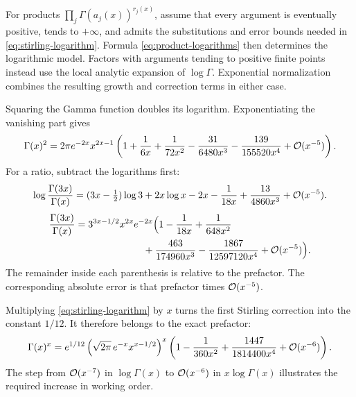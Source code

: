 For products $\prod_j\Gamma(a_j(x))^{r_j(x)}$, assume that every argument
is eventually positive, tends to $+\infty$, and admits the substitutions
and error bounds needed in \eqref{eq:stirling-logarithm}. Formula
\eqref{eq:product-logarithms} then determines the logarithmic model.
Factors with arguments tending to positive finite points instead use
the local analytic expansion of $\log\Gamma$. Exponential normalization
combines the resulting growth and correction terms in either case.

\begin{example}
Squaring the Gamma function doubles its logarithm. Exponentiating the
vanishing part gives
\begin{equation}
 \Gamma(x)^2=
 2\pi e^{-2x}x^{2x-1}
 \left(1+\frac1{6x}+\frac1{72x^2}
       -\frac{31}{6480x^3}-\frac{139}{155520x^4}
       +\mathcal O(x^{-5})\right).
 \label{eq:gamma-square-expansion}
\end{equation}
For a ratio, subtract the logarithms first:
\begin{equation}
 \log\frac{\Gamma(3x)}{\Gamma(x)}
 = (3x-\tfrac12)\log3+2x\log x-2x
       -\frac1{18x}+\frac{13}{4860x^3}+\mathcal O(x^{-5}).
\end{equation}
\begin{equation}
\begin{aligned}
 \frac{\Gamma(3x)}{\Gamma(x)}
 &=3^{3x-1/2}x^{2x}e^{-2x}
 \Bigl(1-\frac1{18x}+\frac1{648x^2}\\
 &\hspace{7em}+\frac{463}{174960x^3}-\frac{1867}{12597120x^4}
       +\mathcal O(x^{-5})\Bigr).
\end{aligned}
 \label{eq:gamma-ratio-expansion}
\end{equation}
The remainder inside each parenthesis is relative to the prefactor.
The corresponding absolute error is that prefactor times $\mathcal O(x^{-5})$.
\end{example}

\begin{example}
Multiplying \eqref{eq:stirling-logarithm} by $x$ turns the first
Stirling correction into the constant $1/12$. It therefore belongs to
the exact prefactor:
\begin{equation}
 \Gamma(x)^x=e^{1/12}
 \left(\sqrt{2\pi}\,e^{-x}x^{x-1/2}\right)^x
 \left(1-\frac1{360x^2}+\frac{1447}{1814400x^4}
       +\mathcal O(x^{-6})\right).
 \label{eq:gamma-varying-power}
\end{equation}
The step from $\mathcal O(x^{-7})$ in $\log\Gamma(x)$ to $\mathcal O(x^{-6})$
in $x\log\Gamma(x)$ illustrates the required increase in working order.
\end{example}

